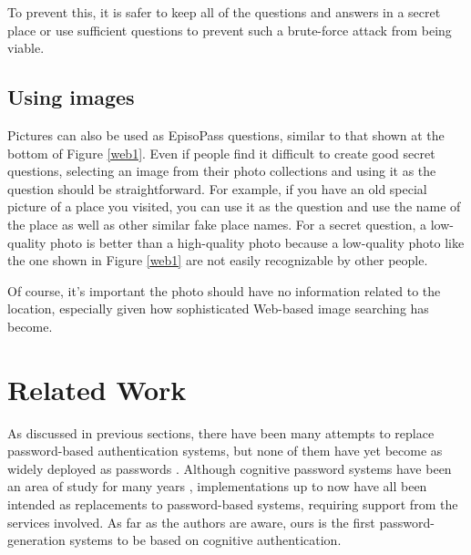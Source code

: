 \documentclass[runningheads,a4paper]{llncs}
\begin{document}
%
To prevent this, it is safer to keep all of the questions and answers
in a secret place or
use sufficient questions to prevent such a brute-force attack from being viable.

\subsection{Using images}


Pictures can also be used as EpisoPass questions,
similar to that shown at the bottom of Figure \ref{web1}.
Even if people find it difficult to create good secret questions,
selecting an image from their photo collections
and using it as the question should be straightforward.
For example, if you have an old special picture of a place you visited,
you can use it as the question and use the name of the place
as well as other similar fake place names.
For a secret question, a low-quality photo is better than a
high-quality photo because a low-quality photo
like the one shown in Figure \ref{web1} are not
easily recognizable by other people.

Of course, it's important the photo should have no information related
to the location, especially given how sophisticated
Web-based image searching has become.

\section{Related Work}


As discussed in previous sections,
there have been many attempts to replace password-based authentication systems,
but none of them have yet become as widely deployed as
passwords \cite{Bonneau:ReplacePasswords}.
%
Although cognitive password systems have been an area of study for 
many years \cite{Lazar2011,Zviran:1990:UAC:100512.100538},
implementations up to now have all been intended as replacements 
to password-based systems, requiring support from the services involved.
As far as the authors are aware, ours is the first password-generation systems to be
based on cognitive authentication.
\end{document}
